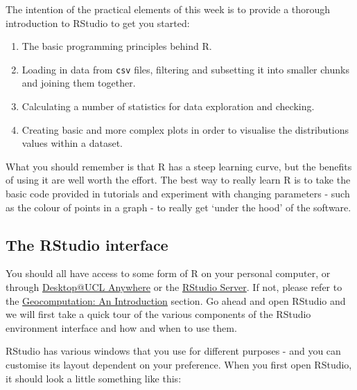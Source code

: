 \documentclass[
]{book}
\providecommand{\tightlist}{%
  \setlength{\itemsep}{0pt}\setlength{\parskip}{0pt}}
\begin{document}
The intention of the practical elements of this week is to provide a thorough introduction to RStudio to get you started:

\begin{enumerate}
\def\labelenumi{\arabic{enumi}.}
\tightlist
\item
  The basic programming principles behind R.
\item
  Loading in data from \texttt{csv} files, filtering and subsetting it into smaller chunks and joining them together.
\item
  Calculating a number of statistics for data exploration and checking.
\item
  Creating basic and more complex plots in order to visualise the distributions values within a dataset.
\end{enumerate}

What you should remember is that R has a steep learning curve, but the benefits of using it are well worth the effort. The best way to really learn R is to take the basic code provided in tutorials and experiment with changing parameters - such as the colour of points in a graph - to really get `under the hood' of the software.

\hypertarget{the-rstudio-interface}{%
\subsection{The RStudio interface}\label{the-rstudio-interface}}

You should all have access to some form of R on your personal computer, or through \href{https://www.ucl.ac.uk/isd/services/computers/remote-access/desktopucl-anywhere}{Desktop@UCL Anywhere} or the \href{https://rstudio.data-science.rc.ucl.ac.uk/auth-sign-in}{RStudio Server}. If not, please refer to the \protect\hyperlink{geocomputation-an-introduction.htmlux5cux23software}{Geocomputation: An Introduction} section. Go ahead and open RStudio and we will first take a quick tour of the various components of the RStudio environment interface and how and when to use them.

RStudio has various windows that you use for different purposes - and you can customise its layout dependent on your preference. When you first open RStudio, it should look a little something like this:
\end{document}

